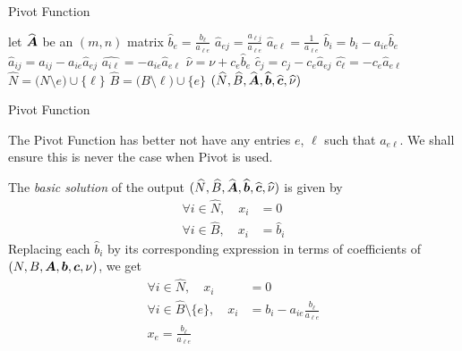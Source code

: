 \documentclass[32pt, aspectratio = 169]{beamer}
\begin{document}
\begin{frame}{Pivot Function}
    \setlength\columnseprule{.1pt}
    \begin{multicols}{2}

    \small{
    \begin{algorithmic}[1]
            \State let $\widehat{\boldsymbol{A}}$ be an $(m, n)$ matrix
            \State $\widehat{b}_e = \frac{b_\ell}{a_{\ell e}}$
                \State $\widehat{a}_{ej} = \frac{a_{\ell j}}{a_{\ell e}}$
            \EndFor
            \State $\widehat{a}_{e\ell} = \frac{1}{a_{\ell e}}$
                \State $\widehat{b}_i = b_i - a_{ie}\widehat{b}_e$
                    \State $\widehat{a}_{ij} = a_{ij} - a_{ie}\widehat{a}_{ej}$
                \EndFor
                \State $\widehat{a_{i\ell}} = -a_{ie}\widehat{a}_{e\ell}$
            \EndFor
            \State $\widehat{\nu} = \nu + c_e\widehat{b}_e$
                \State $\widehat{c}_{j} = c_j - c_e\widehat{a}_{ej}$
            \EndFor
            \State $\widehat{c_{\ell}} = -c_e\widehat{a}_{e\ell}$
            \State $\widehat{N} = \big(N \setminus e \big) \cup \{\ell\}$
            \State $\widehat{B} = \big(B \setminus \ell \big) \cup \{e\}$
            \State \Return $(\widehat{N}, \widehat{B}, \widehat{\boldsymbol{A}}, \widehat{\boldsymbol{b}}, \widehat{\boldsymbol{c}}, \widehat{\nu})$
       \EndFunction
       \Statex
      \end{algorithmic}
      }
    \end{multicols}
\end{frame}

\begin{frame}{Pivot Function}
    \begin{rem}
        The Pivot Function has better not have any entries $e$, $\ell$ such that $a_{e\ell}$. We shall ensure this is never the case when Pivot is used.
    \end{rem}
    The \textit{basic solution} of the output $(\widehat{N}, \widehat{B}, \widehat{\boldsymbol{A}}, \widehat{\boldsymbol{b}}, \widehat{\boldsymbol{c}}, \widehat{\nu})$ is given by
    \begin{align*}
        \forall i \in \widehat{N}, \quad x_i & = 0 \\
        \forall i \in \widehat{B}, \quad x_i & = \widehat{b}_i
    \end{align*}
    Replacing each $\widehat{b}_i$ by its corresponding expression in terms of coefficients of $(N, B, \boldsymbol{A}, \boldsymbol{b}, \boldsymbol{c}, \nu)$, we get
    \begin{align*}
        \forall i \in \widehat{N}, \quad x_i & = 0 \\
        \forall i \in \widehat{B}\setminus \{e\}, \quad x_i & = b_i - a_{ie}\frac{b_\ell}{a_{\ell e}} \\
        x_e = \frac{b_\ell}{a_{\ell e}}
    \end{align*}
\end{frame}
\end{document}
